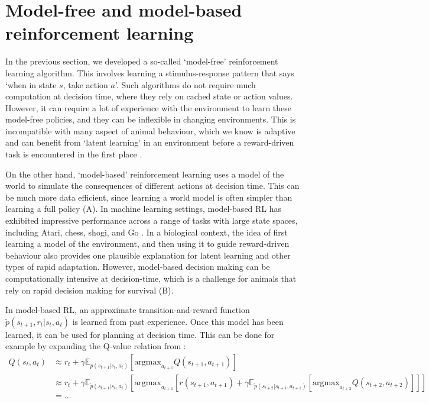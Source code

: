 \section{Model-free and model-based reinforcement learning}
\label{sec:model_free_based}

In the previous section, we developed a so-called `model-free' reinforcement learning algorithm.
This involves learning a stimulus-response pattern that says `when in state $s$, take action $a$'.
Such algorithms do not require much computation at decision time, where they rely on cached state or action values.
However, it can require a lot of experience with the environment to learn these model-free policies, and they can be inflexible in changing environments.
This is incompatible with many aspect of animal behaviour, which we know is adaptive and can benefit from `latent learning' in an environment before a reward-driven task is encountered in the first place \citep{blodgett1929effect,tolman1948cognitive}.

On the other hand, `model-based' reinforcement learning uses a model of the world to simulate the consequences of different actions at decision time.
This can be much more data efficient, since learning a world model is often simpler than learning a full policy (A).
In machine learning settings, model-based RL has exhibited impressive performance across a range of tasks with large state spaces, including Atari, chess, shogi, and Go \citep{silver2018general, schrittwieser2020mastering, deisenroth2011pilco}.
In a biological context, the idea of first learning a model of the environment, and then using it to guide reward-driven behaviour also provides one plausible explanation for latent learning and other types of rapid adaptation.
However, model-based decision making can be computationally intensive at decision-time, which is a challenge for animals that rely on rapid decision making for survival (B).

In model-based RL, an approximate transition-and-reward function $\tilde{p}(s_{t+1}, r_t | s_t, a_t)$ is learned from past experience.
Once this model has been learned, it can be used for planning at decision time.
This can be done for example by expanding the Q-value relation from :
{\small
\begin{align}
    \label{eq:Q-search}
    Q(s_t,a_t) &\approx  r_t + \gamma \mathbb{E}_{\tilde{p}(s_{t+1} | s_t, a_t)} \left [ \text{argmax}_{a_{t+1}} Q(s_{t+1}, a_{t+1}) \right ]\\
    &\approx r_t + \gamma \mathbb{E}_{\tilde{p}(s_{t+1} | s_t, a_t)} \left [ \text{argmax}_{a_{t+1}}
    \left [ r(s_{t+1}, a_{t+1}) + \gamma \mathbb{E}_{\tilde{p}(s_{t+2} | s_{t+1}, a_{t+1})} \left [ \text{argmax}_{a_{t+2}} Q(s_{t+2}, a_{t+2}) \right ] \right ] \right ] \\
    &= \ldots
\end{align}
}

